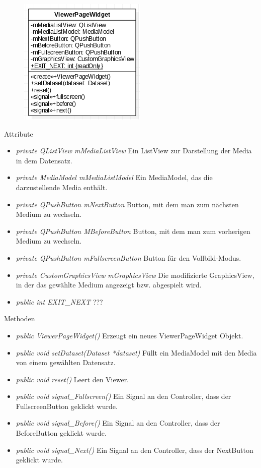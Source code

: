 \begin{figure}[H]
	\centering
	\includegraphics[scale=0.5]{img/Klassendiagramm/Klassen/View/ViewerPageWidget}
	\label{fig:viewerPageWidget}
\end{figure}

Attribute
\begin{itemize}
	\item\textit{private QListView mMediaListView}
	Ein ListView zur Darstellung der Media in dem Datensatz.
	\item\textit{private MediaModel mMediaListModel} 
	Ein MediaModel, das die darzustellende Media enthält.
	\item\textit{private QPushButton mNextButton}
	Button, mit dem man zum nächsten Medium zu wechseln. 
	\item\textit{private QPushButton MBeforeButton}
	Button, mit dem man zum vorherigen Medium zu wechseln.
	\item\textit{private QPushButton mFullscreenButton}
	Button für den Vollbild-Modus.
	\item\textit{private CustomGraphicsView mGraphicsView} 
	Die modifizierte GraphicsView, in der das gewählte Medium angezeigt bzw. abgespielt wird.  
	\item\textit{public int EXIT\_NEXT} 
	???     
\end{itemize}

Methoden
\begin{itemize}
	\item\textit{public ViewerPageWidget()} 
	Erzeugt ein neues ViewerPageWidget Objekt.
	\item\textit{public void setDataset(Dataset *dataset)} 
	Füllt ein MediaModel mit den Media von einem gewählten Datensatz.
	\item\textit{public void reset()} 
	Leert den Viewer.
	\item\textit{public void signal\_Fullscreen()} 
	Ein Signal an den Controller, dass der FullscreenButton geklickt wurde.
	\item\textit{public void signal\_Before()} 
	Ein Signal an den Controller, dass der BeforeButton geklickt wurde.
	\item\textit{public void signal\_Next()}
	Ein Signal an den Controller, dass der NextButton geklickt wurde.
\end{itemize}

